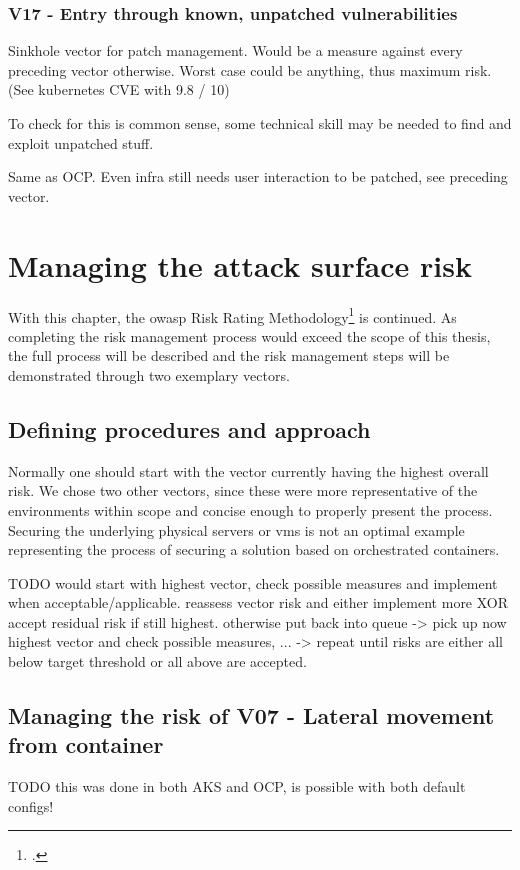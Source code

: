 \subsection{V17 - Entry through known, unpatched vulnerabilities}
Sinkhole vector for patch management. Would be a measure against every preceding vector otherwise.
Worst case could be anything, thus maximum risk. (See kubernetes CVE with 9.8 / 10)

To check for this is common sense, some technical skill may be needed to find and exploit unpatched stuff.

Same as OCP. Even infra still needs user interaction to be patched, see preceding vector.

\chapter{Managing the attack surface risk}

With this chapter, the \gls{owasp} Risk Rating Methodology\footcite{riskRating} is continued. As completing the risk management process would exceed the scope of this thesis, the full process will be described and the risk management steps will be demonstrated through two exemplary vectors.

\section{Defining procedures and approach}
Normally one should start with the vector currently having the highest overall risk. We chose two other vectors, since these were more representative of the environments within scope and concise enough to properly present the process. Securing the underlying physical servers or \gls{vm}s is not an optimal example representing the process of securing a solution based on orchestrated containers.

TODO would start with highest vector, check possible measures and implement when acceptable/applicable. reassess vector risk and either implement more XOR accept residual risk if still highest. otherwise put back into queue -> pick up now highest vector and check possible measures, ... -> repeat until risks are either all below target threshold or all above are accepted.

\section{Managing the risk of V07 - Lateral movement from container}
TODO this was done in both AKS and OCP, is possible with both default configs!

